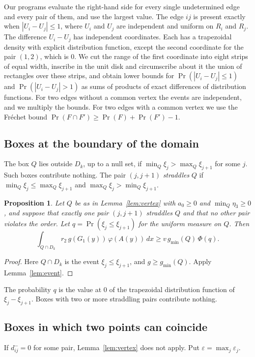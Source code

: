 \documentclass[11pt]{amsart}
\newtheorem{proposition}[theorem]{Proposition}
\theoremstyle{definition}
\theoremstyle{remark}
\numberwithin{equation}{section}
\newcommand{\gmin}{g_{\min}}
\begin{document}
Our programs evaluate the right-hand side for every single undetermined edge and every pair of them, and use the largest value. The edge $ij$ is present exactly when $|U_i-U_j|\le1$, where $U_i$ and $U_j$ are independent and uniform on $R_i$ and $R_j$. The difference $U_i-U_j$ has independent coordinates. Each has a trapezoidal density with explicit distribution function, except the second coordinate for the pair $(1,2)$, which is $0$. We cut the range of the first coordinate into eight strips of equal width, inscribe in the unit disk and circumscribe about it the union of rectangles over these strips, and obtain lower bounds for $\Pr(|U_i-U_j|\le1)$ and $\Pr(|U_i-U_j|>1)$ as sums of products of exact differences of distribution functions. For two edges without a common vertex the events are independent, and we multiply the bounds. For two edges with a common vertex we use the Fr\'echet bound $\Pr(F\cap F')\ge\Pr(F)+\Pr(F')-1$.

\subsection{Boxes at the boundary of the domain}
The box $Q$ lies outside $D_k$, up to a null set, if $\min_Q\xi_j>\max_Q\xi_{j+1}$ for some $j$. Such boxes contribute nothing. The pair $(j,j+1)$ \emph{straddles} $Q$ if $\min_Q\xi_j\le\max_Q\xi_{j+1}$ and $\max_Q\xi_j>\min_Q\xi_{j+1}$.

\begin{proposition}\label{prop:straddle}
Let $Q$ be as in Lemma~\textup{\ref{lem:vertex}} with $a_0\ge0$ and $\min_Q\eta_3\ge0$, and suppose that exactly one pair $(j,j+1)$ straddles $Q$ and that no other pair violates the order. Let $q=\Pr(\xi_j\le\xi_{j+1})$ for the uniform measure on $Q$. Then
\[
\int_{Q\cap D_k}r_2\,g(G_1(y))\,\varphi(A(y))\,dx\ge v\,\gmin(Q)\,\Phi(q).
\]
\end{proposition}

\begin{proof}
Here $Q\cap D_k$ is the event $\xi_j\le\xi_{j+1}$, and $g\ge\gmin(Q)$. Apply Lemma~\ref{lem:event}.
\end{proof}

The probability $q$ is the value at $0$ of the trapezoidal distribution function of $\xi_j-\xi_{j+1}$. Boxes with two or more straddling pairs contribute nothing.

\subsection{Boxes in which two points can coincide}
If $d^-_{ij}=0$ for some pair, Lemma~\ref{lem:vertex} does not apply. Put $\varepsilon=\max_j\varepsilon_j$.
\end{document}
